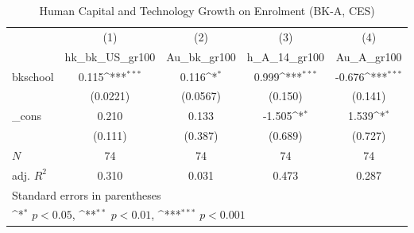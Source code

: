 \begin{table}[htbp]\centering
\def\sym#1{\ifmmode^{#1}\else\(^{#1}\)\fi}
\caption{Human Capital and Technology Growth on Enrolment (BK-A, CES)}
\begin{tabular}{l*{4}{c}}
\toprule
            &\multicolumn{1}{c}{(1)}&\multicolumn{1}{c}{(2)}&\multicolumn{1}{c}{(3)}&\multicolumn{1}{c}{(4)}\\
            &\multicolumn{1}{c}{hk\_bk\_US\_gr100}&\multicolumn{1}{c}{Au\_bk\_gr100}&\multicolumn{1}{c}{h\_A\_14\_gr100}&\multicolumn{1}{c}{Au\_A\_gr100}\\
\midrule
bkschool    &       0.115\sym{***}&       0.116\sym{*}  &       0.999\sym{***}&      -0.676\sym{***}\\
            &    (0.0221)         &    (0.0567)         &     (0.150)         &     (0.141)         \\
\addlinespace
\_cons      &       0.210         &       0.133         &      -1.505\sym{*}  &       1.539\sym{*}  \\
            &     (0.111)         &     (0.387)         &     (0.689)         &     (0.727)         \\
\midrule
\(N\)       &          74         &          74         &          74         &          74         \\
adj. \(R^{2}\)&       0.310         &       0.031         &       0.473         &       0.287         \\
\bottomrule
\multicolumn{5}{l}{\footnotesize Standard errors in parentheses}\\
\multicolumn{5}{l}{\footnotesize \sym{*} \(p<0.05\), \sym{**} \(p<0.01\), \sym{***} \(p<0.001\)}\\
\end{tabular}
\end{table}
